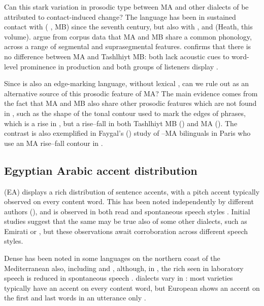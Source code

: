 \documentclass[output=paper]{langsci/langscibook}
\begin{document}
Can this stark variation in prosodic type between MA and other dialects of  be attributed to contact-induced change? The  language has been in sustained contact with  ( , MB) since the seventh century, but also with ,  and  (Heath, this volume). \citet{MaasProcházka2012} argue from corpus data that MA and MB share a common phonology, across a range of segmental and suprasegmental features. \citet{Bruggeman2018} confirms that there is no difference between MA and Tashlhiyt MB: both lack acoustic cues to word-level prominence in production and both groups of listeners display  . 

Since  is also an edge-marking language, without lexical , can we rule out  as an alternative source of this prosodic feature of MA? The main evidence comes from the fact that MA and MB also share other prosodic features which are not found in , such as the shape of the tonal contour used to mark the edges of phrases, which is a rise in  \citep{Delais-Roussarieetal2015}, but a rise--fall in both Tashlhiyt MB (\citealt{GriceEtAl2015,BruggemanRoettgerGrice2017}) and MA (\citealt{Benkirane1998,Hellmuthtoappearbook}). The contrast is also exemplified in Faygal's (\citeyear{Fagyal2005}) study of --MA bilinguals in Paris who use an MA rise--fall contour in .  


 
 \subsection{Egyptian Arabic accent distribution} \label{egypt}


   (EA) displays a rich distribution of sentence accents, with a pitch accent typically observed on every content word. This has been noted independently by different authors (\citealt{Rifaat1991,Rastegar-ElZarka1997}), and is observed in both read and spontaneous speech styles \citep{Hellmuth2006}. Initial studies suggest that the same may be true also of some other dialects, such as Emirati \citep{BlodgettOwensRockwood2007} or  \citep{Alzaidi2014}, but these observations await corroboration across different speech styles. 

Dense  has been noted in some languages on the northern coast of the Mediterranean also, including  and   \citep{Jun2005}, although, in , the rich  seen in laboratory speech is reduced in spontaneous speech \citep{Face2003}.  dialects vary in : most varieties typically have an accent on every content word, but  European  shows an accent on the first and last words in an utterance only \citep{FrotaEtAl2015}. 
\end{document}
